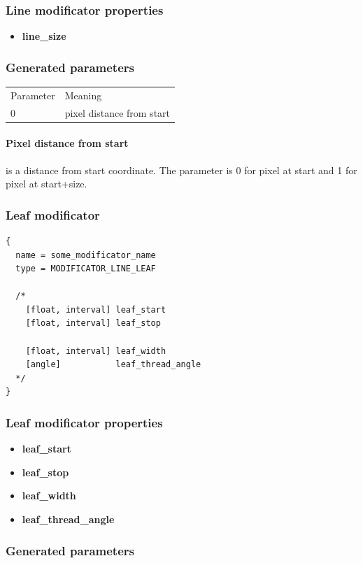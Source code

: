 \documentclass[9pt]{article}
\begin{document}
\subsubsection*{Line modificator properties}
\begin{itemize}
\item{\bf line\_size}
\end{itemize}

\subsubsection*{Generated parameters}

\begin{tabular}{|l||l|}
  Parameter & Meaning \\
  0 & pixel distance from start \\
\end{tabular}

\paragraph*{Pixel distance from start} is a distance from start coordinate. 
The parameter is 0 for pixel at start and 1 for pixel at start+size.

\subsubsection{Leaf modificator}

\begin{verbatim}
{
  name = some_modificator_name
  type = MODIFICATOR_LINE_LEAF

  /*
    [float, interval] leaf_start
    [float, interval] leaf_stop
  
    [float, interval] leaf_width
    [angle]           leaf_thread_angle
  */
}
\end{verbatim}
\subsubsection*{Leaf modificator properties}
\begin{itemize}
\item{\bf leaf\_start}
\item{\bf leaf\_stop}
\item{\bf leaf\_width}
\item{\bf leaf\_thread\_angle}
\end{itemize}

\subsubsection*{Generated parameters}
\end{document}
